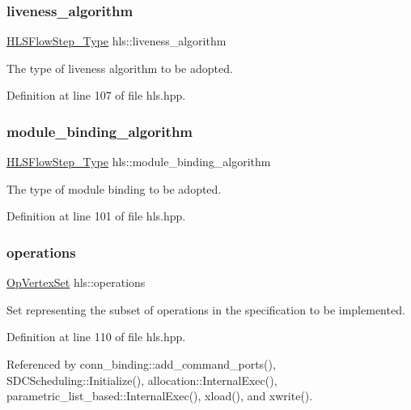 \subsubsection{\texorpdfstring{liveness\+\_\+algorithm}{liveness\_algorithm}}
{\footnotesize\ttfamily \hyperlink{hls__step_8hpp_ada16bc22905016180e26fc7e39537f8d}{H\+L\+S\+Flow\+Step\+\_\+\+Type} hls\+::liveness\+\_\+algorithm}



The type of liveness algorithm to be adopted. 



Definition at line 107 of file hls.\+hpp.

\mbox{\label{classhls_a28821b6aa53285a11d8753f1eee83f51}} 
\subsubsection{\texorpdfstring{module\+\_\+binding\+\_\+algorithm}{module\_binding\_algorithm}}
{\footnotesize\ttfamily \hyperlink{hls__step_8hpp_ada16bc22905016180e26fc7e39537f8d}{H\+L\+S\+Flow\+Step\+\_\+\+Type} hls\+::module\+\_\+binding\+\_\+algorithm}



The type of module binding to be adopted. 



Definition at line 101 of file hls.\+hpp.

\mbox{\label{classhls_a93d8454c7ca39afe832a6fd7cbabd227}} 
\subsubsection{\texorpdfstring{operations}{operations}}
{\footnotesize\ttfamily \hyperlink{classOpVertexSet}{Op\+Vertex\+Set} hls\+::operations}



Set representing the subset of operations in the specification to be implemented. 



Definition at line 110 of file hls.\+hpp.



Referenced by conn\+\_\+binding\+::add\+\_\+command\+\_\+ports(), S\+D\+C\+Scheduling\+::\+Initialize(), allocation\+::\+Internal\+Exec(), parametric\+\_\+list\+\_\+based\+::\+Internal\+Exec(), xload(), and xwrite().

